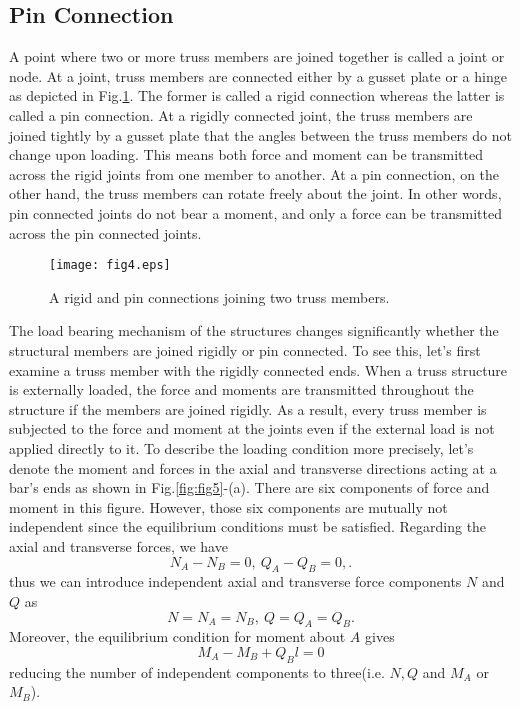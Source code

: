 ﻿\documentclass[10pt,a4j]{article}
\begin{document}
\subsection{Pin Connection}
A point where two or more truss members are joined together is called a joint or node. 
At a joint, truss members are connected either by a gusset plate or a hinge as depicted 
in Fig.\ref{fig:fig4}. The former is called a rigid connection whereas the latter is called 
a pin connection. At a rigidly connected joint, the truss members are joined 
tightly by a gusset plate that the angles between the truss members do not 
change upon loading. This means both force and moment can be transmitted across 
the rigid joints from one member to another. 
At a pin connection, on the other hand, the truss members can rotate freely about 
the joint. In other words, pin connected joints do not bear a moment, and 
only a force can be transmitted across the pin connected joints. 
\begin{figure}[h]
	\begin{center}
	\texttt{[image: fig4.eps]} 
	\end{center}
	\caption{A rigid and pin connections joining two truss members.} 
	\label{fig:fig4}
\end{figure}

The load bearing mechanism of the structures changes significantly whether the 
structural members are joined rigidly or pin connected. To see this, let's first 
examine a truss member with the rigidly connected ends. When a truss structure is externally loaded, 
the force and moments are transmitted throughout the structure if the 
members are joined rigidly. As a result, every truss member is subjected to 
the force and moment at the joints even if the external load is not applied 
directly to it. To describe the loading condition more precisely, let's 
denote the moment and forces in the axial and transverse directions 
acting at a bar's ends as shown in Fig.\ref{fig:fig5}-(a). 
There are six components of force and moment in this figure. 
However, those six components are  mutually not  independent since 
the equilibrium conditions must be satisfied. 
Regarding the axial and transverse forces, we have 
\begin{equation}
	N_A-N_B=0, \ Q_A-Q_B=0, .
	\label{eqn:}
\end{equation}
thus we can introduce independent axial and transverse force components $N$ and $Q$ as
\begin{equation}
	N=N_A=N_B,\  Q=Q_A=Q_B.
	\label{eqn:}
\end{equation}
Moreover, the equilibrium condition for moment about $A$ gives 
\begin{equation}
	M_A-M_B+Q_Bl=0 
	\label{eqn:equib_Mab}
\end{equation}
reducing the number of independent components to three(i.e. $N,Q$ and $M_A$ or $M_B$).\\
\end{document}

